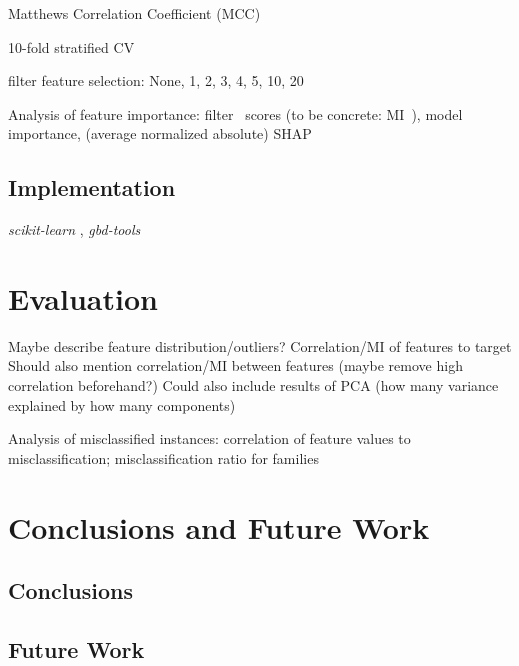 \documentclass{article}
\begin{document}
Matthews Correlation Coefficient (MCC)~\cite{matthews1975comparison, gorodkin2004comparing}

10-fold stratified CV

filter feature selection: None, 1, 2, 3, 4, 5, 10, 20

Analysis of feature importance: filter~\cite{guyon2003introduction} scores (to be concrete: MI~\cite{kraskov2004estimating}), model importance, (average normalized absolute) SHAP~\cite{lundberg2017unified}

\subsection{Implementation}

\emph{scikit-learn} \cite{pedregosa2011scikit}, \emph{gbd-tools}~\cite{iser2020collaborative}

\section{Evaluation}
\label{sec:evaluation}

Maybe describe feature distribution/outliers?
Correlation/MI of features to target
Should also mention correlation/MI between features (maybe remove high correlation beforehand?)
Could also include results of PCA (how many variance explained by how many components)

Analysis of misclassified instances: correlation of feature values to misclassification; misclassification ratio for families

\section{Conclusions and Future Work}
\label{sec:conclusion}

\subsection{Conclusions}

\subsection{Future Work}

\printbibliography
\end{document}
